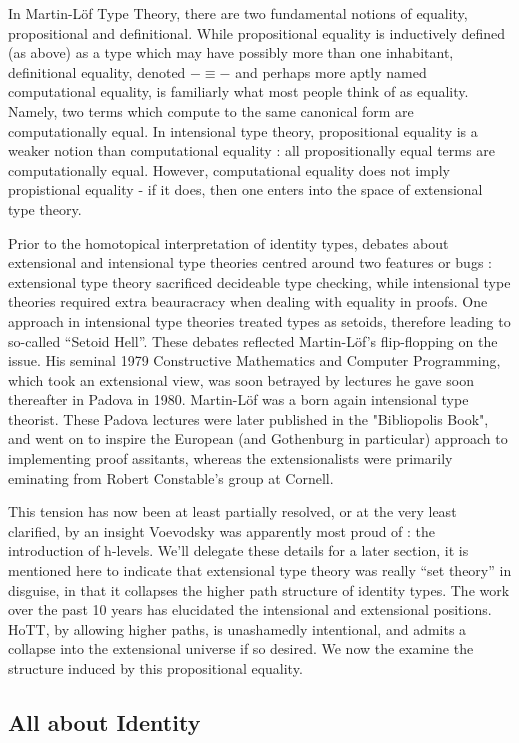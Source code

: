 \documentclass[11pt, a4paper]{article}
\begin{document}
In Martin-Löf Type Theory, there are two fundamental notions of equality,
propositional and definitional. While propositional equality is inductively
defined (as above) as a type which may have possibly more than one inhabitant,
definitional equality, denoted $-\equiv -$ and perhaps more aptly named
computational equality, is familiarly what most people think of as equality.
Namely, two terms which compute to the same canonical form are computationally
equal. In intensional type theory, propositional equality is a weaker notion
than computational equality : all propositionally equal terms are
computationally equal. However, computational equality does not imply
propistional equality - if it does, then one enters into the space of
extensional type theory.

Prior to the homotopical interpretation of identity types, debates about
extensional and intensional type theories centred around two features or bugs :
extensional type theory sacrificed decideable type checking, while intensional
type theories required extra beauracracy when dealing with equality in proofs.
One approach in intensional type theories treated types as setoids, therefore
leading to so-called ``Setoid Hell''. These debates reflected Martin-Löf's
flip-flopping on the issue. His seminal 1979 Constructive Mathematics and
Computer Programming, which took an extensional view, was soon betrayed by
lectures he gave soon thereafter in Padova in 1980. Martin-Löf was a born again
intensional type theorist. These Padova lectures were later published in the
"Bibliopolis Book", and went on to inspire the European (and Gothenburg in
particular) approach to implementing proof assitants, whereas the
extensionalists were primarily eminating from Robert Constable's group at
Cornell.

This tension has now been at least partially resolved, or at the very least
clarified, by an insight Voevodsky was apparently most proud of : the
introduction of h-levels. We'll delegate these details for a later section, it
is mentioned here to indicate that extensional type theory was really ``set
theory'' in disguise, in that it collapses the higher path structure of identity
types. The work over the past 10 years has elucidated the intensional and
extensional positions. HoTT, by allowing higher paths, is unashamedly
intentional, and admits a collapse into the extensional universe if so desired.
We now the examine the structure induced by this propositional equality.

\subsection{All about Identity}
\end{document}
